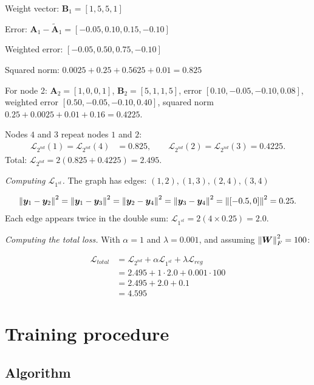 \begin{notechapter}
\begin{example}
Weight vector: $\bm{B}_1 = [1, 5, 5, 1]$

Error: $\bm{A}_1 - \tilde{\bm{A}}_1 = [-0.05, 0.10, 0.15, -0.10]$

Weighted error: $[-0.05, 0.50, 0.75, -0.10]$

Squared norm: $0.0025 + 0.25 + 0.5625 + 0.01 = 0.825$

For node 2: $\bm{A}_2 = [1, 0, 0, 1]$, $\bm B_2 = [5, 1, 1, 5]$, error $[0.10, -0.05, -0.10, 0.08]$, weighted error $[0.50, -0.05, -0.10, 0.40]$, squared norm $0.25 + 0.0025 + 0.01 + 0.16 = 0.4225$.

Nodes $4$ and $3$ repeat nodes $1$ and $2$:
\begin{align*}
\mathcal{L}_{2^{nd}}(1) = \mathcal{L}_{2^{nd}}(4) &= 0.825, \qquad
\mathcal{L}_{2^{nd}}(2) = \mathcal{L}_{2^{nd}}(3) = 0.4225 .
\end{align*}
Total: $\mathcal{L}_{2^{nd}} = 2(0.825 + 0.4225) = 2.495$.

\emph{Computing $\mathcal{L}_{1^{st}}$.}
The graph has edges: $(1,2), (1,3), (2,4), (3,4)$

\begin{align*}
\left\|\bm{y}_1 - \bm{y}_2\right\|^2 = \left\|\bm{y}_1 - \bm{y}_3\right\|^2 = \left\|\bm{y}_2 - \bm{y}_4\right\|^2 = \left\|\bm{y}_3 - \bm{y}_4\right\|^2 = \left\|[-0.5, 0]\right\|^2 = 0.25 .
\end{align*}
Each edge appears twice in the double sum: $\mathcal{L}_{1^{st}} = 2(4\times0.25) = 2.0$.

\emph{Computing the total loss.}
With $\alpha = 1$ and $\lambda = 0.001$, and assuming $\left\|\bm{W}\right\|^2_F = 100$:

\begin{align*}
\mathcal{L}_{total} &= \mathcal{L}_{2^{nd}} + \alpha \mathcal{L}_{1^{st}} + \lambda \mathcal{L}_{reg} \\
&= 2.495 + 1 \cdot 2.0 + 0.001 \cdot 100 \\
&= 2.495 + 2.0 + 0.1 \\
&= 4.595
\end{align*}
\end{example}

\section{Training procedure}

\subsection{Algorithm}


\end{notechapter}
